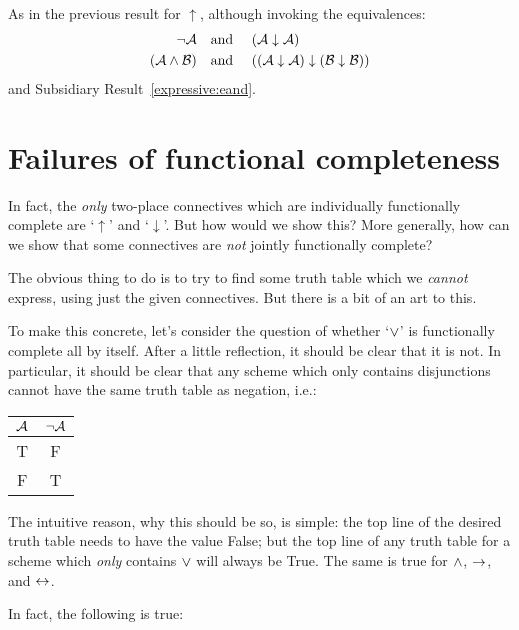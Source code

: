 As in the previous result for $\uparrow$, although invoking the equivalences:
		\begin{align*}
			\neg \mathcal{A} &\text{\quad and \quad} (\mathcal{A} \downarrow \mathcal{A})\\
			(\mathcal{A} \wedge \mathcal{B}) & \text{\quad and \quad} ((\mathcal{A} \downarrow \mathcal{A}) \downarrow (\mathcal{B} \downarrow \mathcal{B}))
		\end{align*}
and Subsidiary Result~\ref{expressive:eand}.


\section{Failures of functional completeness}

In fact, the \emph{only} two-place connectives which are individually functionally complete are `$\uparrow$' and `$\downarrow$'. But how would we show this? More generally, how can we show that some connectives are \emph{not} jointly functionally complete? 
 
The obvious thing to do is to try to find some truth table which we \emph{cannot} express, using just the given connectives. But there is a bit of an art to this.

To make this concrete, let's consider the question of whether `$\vee$' is functionally complete all by itself. After a little reflection, it should be clear that it is not. In particular, it should be clear that any scheme which only contains disjunctions cannot have the same truth table as negation, i.e.:
				\begin{center}
				\begin{tabular}{c | c}
				$\mathcal{A}$ & $\neg \mathcal{A}$\\
				\hline
				 T & F \\
				 F & T
				\end{tabular}
				\end{center}
The intuitive reason, why this should be so, is simple: the top line of the desired truth table needs to have the value False; but the top line of any truth table for a scheme which \emph{only} contains $\vee$ will always be True. The same is true for $\wedge$, $\rightarrow$, and $\leftrightarrow$.

In fact, the following is true:
        

